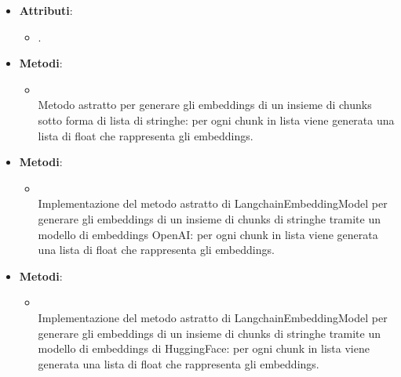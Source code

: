 \documentclass[10pt, a4paper]{article}
\begin{document}
    \label{LangchainEmbeddingModelDettaglio}
    \begin{itemize}
        \item \textbf{Attributi}:
        \begin{itemize}
            \item {}.
        \end{itemize}
        \item \textbf{Metodi}:
        \begin{itemize}
            \item {}\\
            Metodo astratto per generare gli embeddings di un insieme di chunks sotto forma di lista di stringhe: per ogni chunk in lista viene generata una lista di float che rappresenta gli embeddings.
        \end{itemize}
    \end{itemize}
    
    \label{OpenAIEmbeddingModelDettaglio}
    \begin{itemize}
        \item \textbf{Metodi}:
        \begin{itemize}
            \item {}\\
            Implementazione del metodo astratto di LangchainEmbeddingModel per generare gli embeddings di un insieme di chunks di stringhe tramite un modello di embeddings OpenAI: per ogni chunk in lista viene generata una lista di float che rappresenta gli embeddings.
        \end{itemize}
    \end{itemize}
    
    \label{HuggingFaceEmbeddingModelDettaglio}
    \begin{itemize}
        \item \textbf{Metodi}:
        \begin{itemize}
            \item {}\\
            Implementazione del metodo astratto di LangchainEmbeddingModel per generare gli embeddings di un insieme di chunks di stringhe tramite un modello di embeddings di HuggingFace: per ogni chunk in lista viene generata una lista di float che rappresenta gli embeddings.
        \end{itemize}
    \end{itemize}
    
\end{document}
